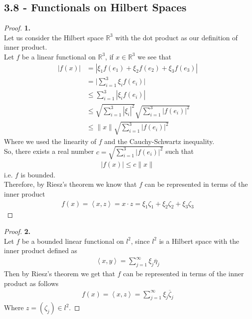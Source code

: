 \documentclass[11pt]{article}
\newcommand{\R}{\mathbb{R}}
\newcommand{\inprd}[1]{\left\langle{#1}\right\rangle}
\theoremstyle{definition}
\begin{document}
\subsection*{3.8 - Functionals on Hilbert Spaces}
\begin{proof}{\textbf{1.}}\\
Let us consider the Hilbert space $\R^3$ with the dot product as our definition
of inner product.\\
Let $f$ be a linear functional on $\R^3$, if $x \in \R^3$ we see that
\begin{align*}
    |f(x)|
    &= |\xi_1 f(e_1) + \xi_2 f(e_2) + \xi_3 f(e_3)|\\
    &= \bigg|\sum_{i=1}^3 \xi_i f(e_i)\bigg|\\
    &\leq \sum_{i=1}^3 |\xi_i f(e_i)|\\
    &\leq \sqrt{\sum_{i=1}^3 |\xi_i|^2} \sqrt{\sum_{i=1}^3 |f(e_i)|^2}\\
    &\leq \|x\| \sqrt{\sum_{i=1}^3 |f(e_i)|^2}
\end{align*}
Where we used the linearity of $f$ and the Cauchy-Schwartz inequality.\\
So, there exists a real number $c = \sqrt{\sum_{i=1}^3 |f(e_i)|^2}$ such that
\begin{align*}
    |f(x)| \leq c \|x\|
\end{align*}
i.e. $f$ is bounded.\\
Therefore, by Riesz's theorem we know that $f$ can be represented in terms of
the inner product
\begin{align*}
    f(x) = \inprd{x, z} = x\cdot z
    = \xi_{1}\zeta_1 + \xi_{2}\zeta_2 + \xi_{3}\zeta_3
\end{align*}
\end{proof}

\cleardoublepage
\begin{proof}{\textbf{2.}}\\
Let $f$ be a bounded linear functional on $l^2$, since $l^2$ is a Hilbert space
with the inner product defined as
\begin{align*}
    \inprd{x,y} = \sum_{j=1}^\infty \xi_j \overline{\eta}_j
\end{align*}
Then by Riesz's theorem we get that $f$ can be represented in terms of the
inner product as follows
\begin{align*}
    f(x) = \inprd{x,z} = \sum_{j=1}^\infty \xi_j \overline{\zeta}_j
\end{align*}
Where $z = (\zeta_j) \in l^2$.
\end{proof}
\end{document}
